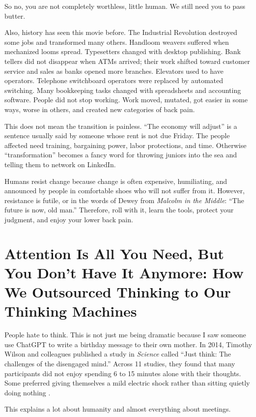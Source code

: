 \documentclass[12pt,oneside]{book}
\begin{document}
So no, you are not completely worthless, little human. We still need you to pass butter.

Also, history has seen this movie before. The Industrial Revolution destroyed some jobs and transformed many others. Handloom weavers suffered when mechanized looms spread. Typesetters changed with desktop publishing. Bank tellers did not disappear when ATMs arrived; their work shifted toward customer service and sales as banks opened more branches. Elevators used to have operators. Telephone switchboard operators were replaced by automated switching. Many bookkeeping tasks changed with spreadsheets and accounting software. People did not stop working. Work moved, mutated, got easier in some ways, worse in others, and created new categories of back pain.

This does not mean the transition is painless. ``The economy will adjust'' is a sentence usually said by someone whose rent is not due Friday. The people affected need training, bargaining power, labor protections, and time. Otherwise ``transformation'' becomes a fancy word for throwing juniors into the sea and telling them to network on LinkedIn.

Humans resist change because change is often expensive, humiliating, and announced by people in comfortable shoes who will not suffer from it. However, resistance is futile, or in the words of Dewey from \emph{Malcolm in the Middle}: ``The future is now, old man.'' Therefore, roll with it, learn the tools, protect your judgment, and enjoy your lower back pain.

\chapter{Attention Is All You Need, But You Don't Have It Anymore: How We Outsourced Thinking to Our Thinking Machines}

People hate to think. This is not just me being dramatic because I saw someone use ChatGPT to write a birthday message to their own mother. In 2014, Timothy Wilson and colleagues published a study in \emph{Science} called ``Just think: The challenges of the disengaged mind.'' Across 11 studies, they found that many participants did not enjoy spending 6 to 15 minutes alone with their thoughts. Some preferred giving themselves a mild electric shock rather than sitting quietly doing nothing \parencite{wilson2014}.

This explains a lot about humanity and almost everything about meetings.
\end{document}
